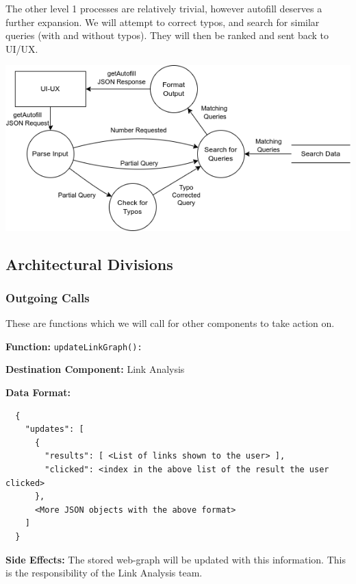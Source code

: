 \medskip

The other level 1 processes are relatively trivial, however autofill deserves a further expansion. We will attempt to correct typos, and search for similar queries (with and without typos). They will then be ranked and sent back to UI/UX.

\begin{center}
  \includegraphics[scale=0.5]{DFDs/LowLevelDFDs-GetAutofill.drawio (2).png}
\end{center}

\subsection*{Architectural Divisions}

\subsubsection*{Outgoing Calls}

These are functions which we will call for other components to take action on.

\medskip

\textbf{Function:} \verb|updateLinkGraph():|

\smallskip

\textbf{Destination Component:} Link Analysis

\smallskip

\textbf{Data Format:} \begin{verbatim}
  {
    "updates": [
      {
        "results": [ <List of links shown to the user> ],
        "clicked": <index in the above list of the result the user clicked>
      },
      <More JSON objects with the above format>
    ]
  }
\end{verbatim}

\smallskip

\textbf{Side Effects:} The stored web-graph will be updated with this information. This is the responsibility of the Link Analysis team.

